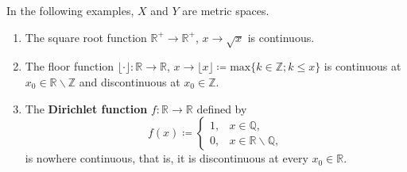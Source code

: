 \begin{eg}
    In the following examples, \(X\) and \(Y\) are metric spaces. 
    \begin{enumerate}[label=(\alph*)]
        \item The square root function \(\mathbb{R}^+ \to \mathbb{R}^+\), \(x \to \sqrt{x}\)
        is continuous. 
        \item The floor function \(\lfloor \cdot \rfloor \colon \mathbb{R} \to \mathbb{R}\),
        \(x \to \lfloor x \rfloor \coloneqq \text{max}\{k\in \mathbb{Z}; k \leq x\}\) is 
        continuous at \(x_0 \in \mathbb{R} \backslash \mathbb{Z} \) and discontinuous at 
        \(x_0 \in \mathbb{Z}\). 
        
        \item The \textbf{Dirichlet function } \(f \colon \mathbb{R} \to \mathbb{R}\) defined
        by 
        \[
           f(x) \coloneqq \begin{cases}
                1, & x \in \mathbb{Q}, \\ 
                0, & x \in \mathbb{R} \backslash \mathbb{Q}, 
           \end{cases}  
        \]
        is nowhere continuous, that is, it is discontinuous at every \(x_0 \in \mathbb{R}\). 


\end{enumerate}
\end{eg}
